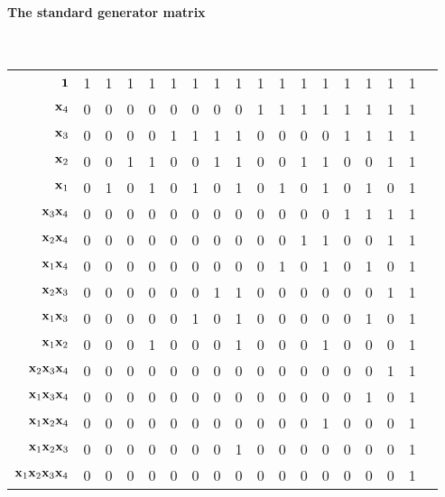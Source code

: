 \documentclass[a4paper, 11pt, openany]{book}
\begin{document}
\paragraph{The standard generator matrix}
~\\
\begin{tabular}{rccccccccccccccccc}
	${\bf 1}$  										& 1 & 1 & 1 & 1 & 1 & 1 & 1 & 1 & 1 & 1 & 1 & 1 & 1 & 1 & 1 & 1 \\
	\cline{2-17}
	${\bf x}_4$  									& 0 & 0 & 0 & 0 & 0 & 0 & 0 & 0 & 1 & 1 & 1 & 1 & 1 & 1 & 1 & 1 \\
	${\bf x}_3$  									& 0 & 0 & 0 & 0 & 1 & 1 & 1 & 1 & 0 & 0 & 0 & 0 & 1 & 1 & 1 & 1 \\
	${\bf x}_2$  									& 0 & 0 & 1 & 1 & 0 & 0 & 1 & 1 & 0 & 0 & 1 & 1 & 0 & 0 & 1 & 1 \\
	${\bf x}_1$  									& 0 & 1 & 0 & 1 & 0 & 1 & 0 & 1 & 0 & 1 & 0 & 1 & 0 & 1 & 0 & 1 \\
	\cline{2-17}
	${\bf x}_3 {\bf x}_4$  							& 0 & 0 & 0 & 0 & 0 & 0 & 0 & 0 & 0 & 0 & 0 & 0 & 1 & 1 & 1 & 1 \\
	${\bf x}_2 {\bf x}_4$  							& 0 & 0 & 0 & 0 & 0 & 0 & 0 & 0 & 0 & 0 & 1 & 1 & 0 & 0 & 1 & 1 \\
	${\bf x}_1 {\bf x}_4$  							& 0 & 0 & 0 & 0 & 0 & 0 & 0 & 0 & 0 & 1 & 0 & 1 & 0 & 1 & 0 & 1 \\
	${\bf x}_2 {\bf x}_3$  							& 0 & 0 & 0 & 0 & 0 & 0 & 1 & 1 & 0 & 0 & 0 & 0 & 0 & 0 & 1 & 1 \\
	${\bf x}_1 {\bf x}_3$  							& 0 & 0 & 0 & 0 & 0 & 1 & 0 & 1 & 0 & 0 & 0 & 0 & 0 & 1 & 0 & 1 \\
	${\bf x}_1 {\bf x}_2$  							& 0 & 0 & 0 & 1 & 0 & 0 & 0 & 1 & 0 & 0 & 0 & 1 & 0 & 0 & 0 & 1 \\
	\cline{2-17}
	${\bf x}_2 {\bf x}_3 {\bf x}_4$  				& 0 & 0 & 0 & 0 & 0 & 0 & 0 & 0 & 0 & 0 & 0 & 0 & 0 & 0 & 1 & 1 \\
	${\bf x}_1 {\bf x}_3 {\bf x}_4$  				& 0 & 0 & 0 & 0 & 0 & 0 & 0 & 0 & 0 & 0 & 0 & 0 & 0 & 1 & 0 & 1 \\
	${\bf x}_1 {\bf x}_2 {\bf x}_4$  				& 0 & 0 & 0 & 0 & 0 & 0 & 0 & 0 & 0 & 0 & 0 & 1 & 0 & 0 & 0 & 1 \\
	${\bf x}_1 {\bf x}_2 {\bf x}_3$  				& 0 & 0 & 0 & 0 & 0 & 0 & 0 & 1 & 0 & 0 & 0 & 0 & 0 & 0 & 0 & 1 \\
	\cline{2-17}
	${\bf x}_1 {\bf x}_2 {\bf x}_3 {\bf x}_4$  		& 0 & 0 & 0 & 0 & 0 & 0 & 0 & 0 & 0 & 0 & 0 & 0 & 0 & 0 & 0 & 1
\end{tabular}
~\\
\end{document}
